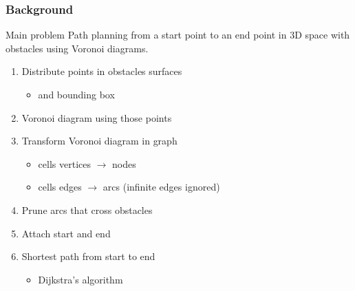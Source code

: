 \begin{frame}
  \frametitle{Background}
  \begin{block}{Main problem}
    \alert{Path planning} from a \alert{start} point to an \alert{end}
    point in 3D space with obstacles using \alert{Voronoi} diagrams.
  \end{block}\pause
  \begin{enumerate}
  \item Distribute \alert{points} in obstacles surfaces
    \begin{itemize}
    \item and bounding box\pause
    \end{itemize}
  \item \alert{Voronoi} diagram using those points\pause
  \item Transform Voronoi diagram in \alert{graph}
    \begin{itemize}
    \item cells \alert{vertices} $\rightarrow$ \alert{nodes}
    \item cells \alert{edges} $\rightarrow$ \alert{arcs} (infinite edges
      ignored)\pause
    \end{itemize}
  \item \alert{Prune} arcs that cross obstacles\pause
  \item Attach \alert{start} and \alert{end}\pause
  \item Shortest path from start to end
    \begin{itemize}
    \item \alert{Dijkstra}'s algorithm
    \end{itemize}
  \end{enumerate}
\end{frame}



